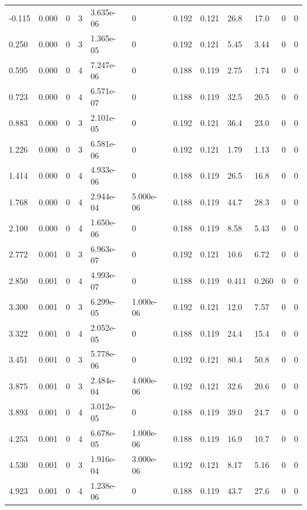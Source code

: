 \documentclass[preview]{standalone}
\begin{document}
{{\begin{tabular}{L{1.2cm}C{1.2cm} C{0.3cm}C{0.5cm} C{1.4cm}C{1.4cm} C{1.4cm}C{1.4cm} C{1.6cm}C{1.6cm} C{1.6cm}C{1.6cm}}
  -0.115  &  0.000  & 0     &  3 &  3.635e-06  & 0  &  0.192&   0.121& 26.8 & 17.0   &  0 & 0  \\ 
  0.250  &  0.000  & 0     &  3 &  1.365e-05  & 0  &  0.192&   0.121& 5.45 & 3.44   &  0 & 0  \\ 
  0.595  &  0.000  & 0     &  4 &  7.247e-06  & 0  &  0.188&   0.119& 2.75 & 1.74   &  0 & 0  \\ 
  0.723  &  0.000  & 0     &  4 &  6.571e-07  & 0  &  0.188&   0.119& 32.5 & 20.5   &  0 & 0  \\ 
  0.883  &  0.000  & 0     &  3 &  2.101e-05  & 0  &  0.192&   0.121& 36.4 & 23.0   &  0 & 0  \\ 
  1.226  &  0.000  & 0     &  3 &  6.581e-06  & 0  &  0.192&   0.121& 1.79 & 1.13   &  0 & 0  \\ 
  1.414  &  0.000  & 0     &  4 &  4.933e-06  & 0  &  0.188&   0.119& 26.5 & 16.8   &  0 & 0  \\ 
  1.768  &  0.000  & 0     &  4 &  2.944e-04  & 5.000e-06  &  0.188&   0.119& 44.7 & 28.3   &  0 & 0  \\ 
  2.100  &  0.000  & 0     &  4 &  1.650e-06  & 0  &  0.188&   0.119& 8.58 & 5.43   &  0 & 0  \\ 
  2.772  &  0.001  & 0     &  3 &  6.963e-07  & 0  &  0.192&   0.121& 10.6 & 6.72   &  0 & 0  \\ 
  2.850  &  0.001  & 0     &  4 &  4.993e-07  & 0  &  0.188&   0.119& 0.411 & 0.260   &  0 & 0  \\ 
  3.300  &  0.001  & 0     &  3 &  6.299e-05  & 1.000e-06  &  0.192&   0.121& 12.0 & 7.57   &  0 & 0  \\ 
  3.322  &  0.001  & 0     &  4 &  2.052e-05  & 0  &  0.188&   0.119& 24.4 & 15.4   &  0 & 0  \\ 
  3.451  &  0.001  & 0     &  3 &  5.778e-06  & 0  &  0.192&   0.121& 80.4 & 50.8   &  0 & 0  \\ 
  3.875  &  0.001  & 0     &  3 &  2.484e-04  & 4.000e-06  &  0.192&   0.121& 32.6 & 20.6   &  0 & 0  \\ 
  3.893  &  0.001  & 0     &  4 &  3.012e-05  & 0  &  0.188&   0.119& 39.0 & 24.7   &  0 & 0  \\ 
  4.253  &  0.001  & 0     &  4 &  6.678e-05  & 1.000e-06  &  0.188&   0.119& 16.9 & 10.7   &  0 & 0  \\ 
  4.530  &  0.001  & 0     &  3 &  1.916e-04  & 3.000e-06  &  0.192&   0.121& 8.17 & 5.16   &  0 & 0  \\ 
  4.923  &  0.001  & 0     &  4 &  1.238e-06  & 0  &  0.188&   0.119& 43.7 & 27.6   &  0 & 0  \\ 

\end{tabular}}}
\end{document}
